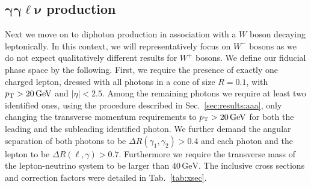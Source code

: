 \subsection[\texorpdfstring{$\gamma\gamma\ell\nu$}{aalnu} production]
           {$\boldsymbol{\gamma\gamma\ell\nu}$ production}
\label{sec:results:aaw}

Next we move on to diphoton production in association with 
a $W$ boson decaying leptonically.
In this context, we will representatively focus on $W^-$ bosons 
as we do not expect qualitatively different results for $W^+$ 
bosons. 
We define our fiducial phase space by the following. 
First, we require the presence of exactly one charged lepton, 
dressed with all photons in a cone of size $R=0.1$, with 
$p_\text{T}>20\,\text{GeV}$ and $|\eta|<2.5$. 
Among the remaining photons we require at least two identified 
ones, using the procedure described in Sec.\ \ref{sec:results:aaa}, 
only changing the transverse momentum requirements to 
$p_\text{T}>20\,\text{GeV}$ for both the leading and the subleading 
identified photon. 
We further demand the angular separation of both photons 
to be $\Delta R(\gamma_1,\gamma_2)>0.4$ and each photon and 
the lepton to be $\Delta R(\ell,\gamma)>0.7$.
Furthermore we require the transverse mass of the lepton-neutrino system
to be larger than $40\, \text{GeV}$.
The inclusive cross sections and correction factors were 
detailed in Tab.\ \ref{tab:xsec}.


